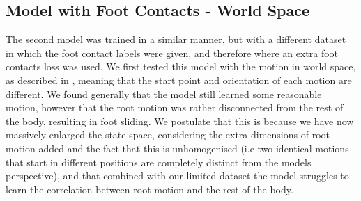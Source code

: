\subsection{Model with Foot Contacts - World Space}
\label{sec:diffusion_contacts_world_space}

The second model was trained in a similar manner, but with a different dataset in which the foot contact labels were given, and therefore where an extra foot contacts loss was used. We first tested this model with the motion in world space, as described in , meaning that the start point and orientation of each motion are different. We found generally that the model still learned some reasonable motion, however that the root motion was rather disconnected from the rest of the body, resulting in foot sliding. We postulate that this is because we have now massively enlarged the state space, considering the extra dimensions of root motion added and the fact that this is unhomogenised (i.e two identical motions that start in different positions are completely distinct from the models perspective), and that combined with our limited dataset the model struggles to learn the correlation between root motion and the rest of the body.



